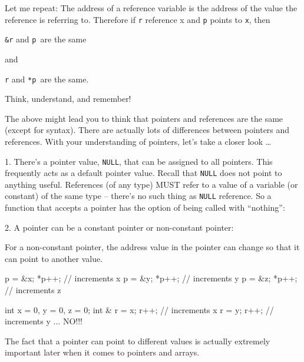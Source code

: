Let me repeat: The address of a reference variable is the address of the value the reference is referring to. Therefore if \texttt{r} reference x and \texttt{p} points to \texttt{x}, then

\texttt{\&r} and \texttt{p }are the same

and

\texttt{r} and \texttt{*p }are the same.

Think, understand, and remember!

\newpage{}

The above might lead you to think that pointers and references are the same (except for syntax). There are actually lots of differences between pointers and references. With your understanding of pointers, let's take a closer look \ldots

1. There's a pointer value, \texttt{NULL}, that can be assigned to all pointers. This frequently acts as a default pointer value. Recall that \texttt{NULL} does not point to anything useful. References (of any type) MUST refer to a value of a variable (or constant) of the same type -- there's no such thing as \texttt{NULL} reference. So a function that accepts a pointer has the option of being called with ``nothing'':

2. A pointer can be a constant pointer or non-constant pointer:


For a non-constant pointer, the address value in the pointer can change so that it can point to another value.

\begin{consolethree}[escapeinside=||]
p = &x; *p++; // increments x
p = &y; *p++; // increments y
p = &z; *p++; // increments z
\end{consolethree}

\begin{consolethree}[escapeinside=||]
int x = 0, y = 0, z = 0;
int & r = x; r++;           // increments x
r = y; r++;                 // increments y ... NO!!!
\end{consolethree}
The fact that a pointer can point to different values is actually extremely important later when it comes to pointers and arrays.

